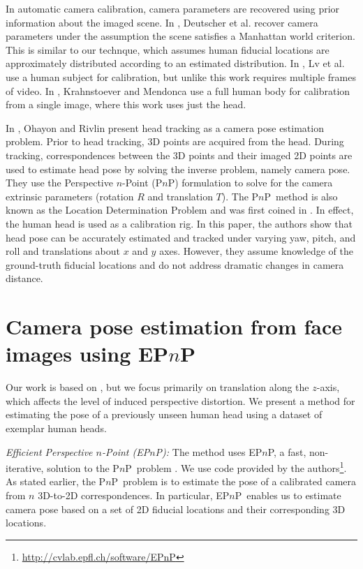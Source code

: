 \documentclass[runningheads]{llncs}
\newcommand {\PnP} {P$n$P}
\newcommand {\EPnP} {EP$n$P}
\begin{document}
In automatic camera calibration, camera parameters are recovered using prior information about the imaged scene.
In \cite{deutscher2002automatic}, Deutscher et al. recover camera parameters under the assumption the scene satisfies a Manhattan world criterion.
This is similar to our technque, which assumes human fiducial locations are approximately distributed according to an estimated distribution. 
In \cite{lv2006camera}, Lv et al. use a human subject for calibration, but unlike this work requires multiple frames of video.
In \cite{krahnstoever2005bayesian}, Krahnstoever and Mendonca use a full human body for calibration from a single image, where this work uses just the head.

In \cite{ohayon2006robust}, Ohayon and Rivlin present head tracking as a camera pose estimation problem.  
Prior to head tracking, 3D points are acquired from the head.  
During tracking, correspondences between the 3D points and their imaged 2D points are used to estimate head pose by solving the inverse problem, namely camera pose. 
They use the Perspective $n$-Point (\PnP) formulation to solve for the camera extrinsic parameters (rotation $R$ and translation $T$).  
The \PnP~method is also known as the Location Determination Problem and was first coined in \cite{ransac}.  
In effect, the human head is used as a calibration rig.  
In this paper, the authors show that head pose can be accurately estimated and tracked under varying yaw, pitch, and roll and translations about $x$ and $y$ axes. 
However, they assume knowledge of the ground-truth fiducial locations and do not address dramatic changes in camera distance.

\section{Camera pose estimation from face images using \EPnP} \label{sec:method}
Our work is based on \cite{ohayon2006robust}, but we focus primarily on translation along the $z$-axis, which affects the level of induced perspective distortion.  
We present a method for estimating the pose of a previously unseen human head using a dataset of exemplar human heads. 

\textit{Efficient Perspective $n$-Point (\EPnP):} The method uses \EPnP, a fast, non-iterative, solution to the \PnP~problem \cite{lepetit2009epnp}.  
We use code provided by the authors\footnote{\url{http://cvlab.epfl.ch/software/EPnP}}.
As stated earlier, the \PnP~problem is to estimate the pose of a calibrated camera from $n$ 3D-to-2D correspondences.
In particular, \EPnP~enables us to estimate camera pose based on a set of 2D fiducial locations and their corresponding 3D locations.
\end{document}
